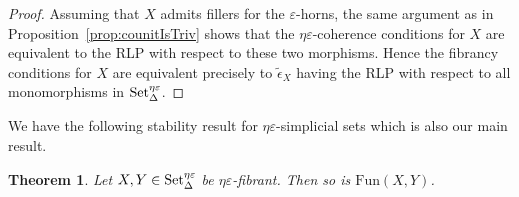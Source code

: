\documentclass{article}
\theoremstyle{plain}
\newtheorem{theorem}{Theorem}[section]
\theoremstyle{definition}
\theoremstyle{remark}
\begin{document}
\begin{proof}
    Assuming that $X$ admits fillers for the $\varepsilon$-horns, the
    same argument as in Proposition~\ref{prop:counitIsTriv} shows that
    the $\eta\varepsilon$-coherence conditions for $X$ are equivalent to
    the RLP with respect to these two morphisms. Hence the fibrancy
    conditions for $X$ are equivalent precisely to
    $\widetilde\epsilon_X$ having the RLP with respect to
    all monomorphisms in $\mathrm{Set}^{\eta\varepsilon}_\Delta$.
\end{proof}

We have the following stability result for $\eta\varepsilon$-simplicial sets which is also our main result.
\begin{theorem}\label{thm:mainEta}
    Let $X,Y\in\mathrm{Set}^{\eta\varepsilon}_\Delta$ be $\eta\varepsilon$-fibrant. Then so is $\mathrm{Fun}(X,Y)$.
\end{theorem}
\end{document}
